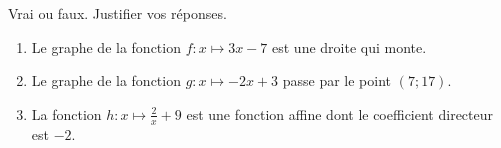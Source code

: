 
\begin{exercice}\label{exosmath-0509}

    Vrai ou faux. Justifier vos réponses.
    \begin{enumerate}
        \item
            Le graphe de la fonction \( f\colon x\mapsto 3x-7\) est une droite qui monte.
        \item
            Le graphe de la fonction \( g\colon x\mapsto -2x+3\) passe par le point \( (7;17)\).
        \item
            La fonction \( h\colon x\mapsto \frac{ 2 }{ x }+9\) est une fonction affine dont le coefficient directeur est \( -2\).
    \end{enumerate}

\end{exercice}
